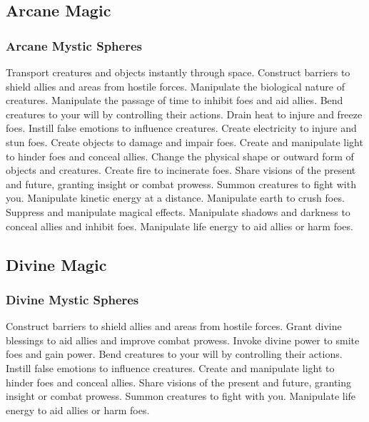 
\small
\subsection{Arcane Magic}\label{Arcane Magic}
\subsubsection{Arcane Mystic Spheres}\label{Arcane Mystic Spheres}
\begin{spelllist}
 Transport creatures and objects instantly through space.
 Construct barriers to shield allies and areas from hostile forces.
 Manipulate the biological nature of creatures.
 Manipulate the passage of time to inhibit foes and aid allies.
 Bend creatures to your will by controlling their actions.
 Drain heat to injure and freeze foes.
 Instill false emotions to influence creatures.
 Create electricity to injure and stun foes.
 Create objects to damage and impair foes.
 Create and manipulate light to hinder foes and conceal allies.
 Change the physical shape or outward form of objects and creatures.
 Create fire to incinerate foes.
 Share visions of the present and future, granting insight or combat prowess.
 Summon creatures to fight with you.
 Manipulate kinetic energy at a distance.
 Manipulate earth to crush foes.
 Suppress and manipulate magical effects.
 Manipulate shadows and darkness to conceal allies and inhibit foes.
 Manipulate life energy to aid allies or harm foes.
\end{spelllist}



\small
\subsection{Divine Magic}\label{Divine Magic}
\subsubsection{Divine Mystic Spheres}\label{Divine Mystic Spheres}
\begin{spelllist}
 Construct barriers to shield allies and areas from hostile forces.
 Grant divine blessings to aid allies and improve combat prowess.
 Invoke divine power to smite foes and gain power.
 Bend creatures to your will by controlling their actions.
 Instill false emotions to influence creatures.
 Create and manipulate light to hinder foes and conceal allies.
 Share visions of the present and future, granting insight or combat prowess.
 Summon creatures to fight with you.
 Manipulate life energy to aid allies or harm foes.
\end{spelllist}



